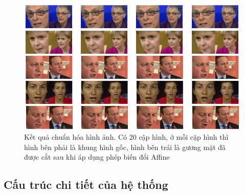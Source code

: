 \begin{figure}[H]
    \centering
    \includegraphics[width=15cm]{./content/materials/preprocess-image.png}
    \caption{Kết quả chuẩn hóa hình ảnh. Có 20 cập hình, ở mỗi cặp hình thì hình bên phải là khung hình gốc, hình bên trái là gương mặt đã được cắt sau khi áp dụng phép biến đổi Affine}
\end{figure}


\subsection{Cấu trúc chi tiết của hệ thống}

